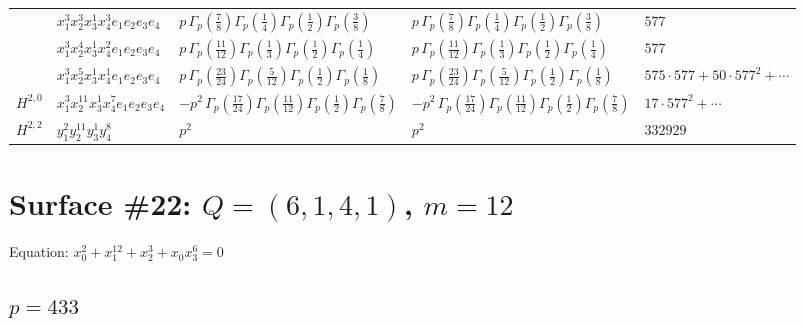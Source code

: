 \documentclass[11pt]{article}
\begin{document}
\begin{table}[ht]
{\begin{tabular}{@{}lllll@{}}
 & $x_{1}^{3} x_{2}^{3} x_{3}^{1} x_{4}^{3}  e_{1} e_{2} e_{3} e_{4}$ & $p \, \Gamma_p \left( \frac{7}{8} \right) \Gamma_p \left( \frac{1}{4} \right) \Gamma_p \left( \frac{1}{2} \right) \Gamma_p \left( \frac{3}{8} \right)$ & $p \, \Gamma_p \left( \frac{7}{8} \right) \Gamma_p \left( \frac{1}{4} \right) \Gamma_p \left( \frac{1}{2} \right) \Gamma_p \left( \frac{3}{8} \right)$ & $577$ \\
 & $x_{1}^{3} x_{2}^{4} x_{3}^{1} x_{4}^{2}  e_{1} e_{2} e_{3} e_{4}$ & $p \, \Gamma_p \left( \frac{11}{12} \right) \Gamma_p \left( \frac{1}{3} \right) \Gamma_p \left( \frac{1}{2} \right) \Gamma_p \left( \frac{1}{4} \right)$ & $p \, \Gamma_p \left( \frac{11}{12} \right) \Gamma_p \left( \frac{1}{3} \right) \Gamma_p \left( \frac{1}{2} \right) \Gamma_p \left( \frac{1}{4} \right)$ & $577$ \\
 & $x_{1}^{3} x_{2}^{5} x_{3}^{1} x_{4}^{1}  e_{1} e_{2} e_{3} e_{4}$ & $p \, \Gamma_p \left( \frac{23}{24} \right) \Gamma_p \left( \frac{5}{12} \right) \Gamma_p \left( \frac{1}{2} \right) \Gamma_p \left( \frac{1}{8} \right)$ & $p \, \Gamma_p \left( \frac{23}{24} \right) \Gamma_p \left( \frac{5}{12} \right) \Gamma_p \left( \frac{1}{2} \right) \Gamma_p \left( \frac{1}{8} \right)$ & $575{\cdot}577{+}50{\cdot}577^{2}{+}\cdots$ \\
\midrule
$H^{2,0}$ & $x_{1}^{3} x_{2}^{11} x_{3}^{1} x_{4}^{7}  e_{1} e_{2} e_{3} e_{4}$ & $- p^{2} \, \Gamma_p \left( \frac{17}{24} \right) \Gamma_p \left( \frac{11}{12} \right) \Gamma_p \left( \frac{1}{2} \right) \Gamma_p \left( \frac{7}{8} \right)$ & $- p^{2} \, \Gamma_p \left( \frac{17}{24} \right) \Gamma_p \left( \frac{11}{12} \right) \Gamma_p \left( \frac{1}{2} \right) \Gamma_p \left( \frac{7}{8} \right)$ & $17{\cdot}577^{2}{+}\cdots$ \\
\midrule
$H^{2,2}$ & $y_{1}^{2} y_{2}^{11} y_{3}^{1} y_{4}^{8}$ & $p^{2} \,$ & $p^{2} \,$ & $332929$ \\
\bottomrule
\end{tabular}
}
\renewcommand{\arraystretch}{1.0}
\end{table}

\newpage

\section*{Surface \#22: $Q=(6, 1, 4, 1)$, $m=12$}

Equation: $x_0^{2} + x_1^{12} + x_2^{3} + x_0 x_3^{6} = 0$

\subsection*{$p = 433$}
\end{document}
